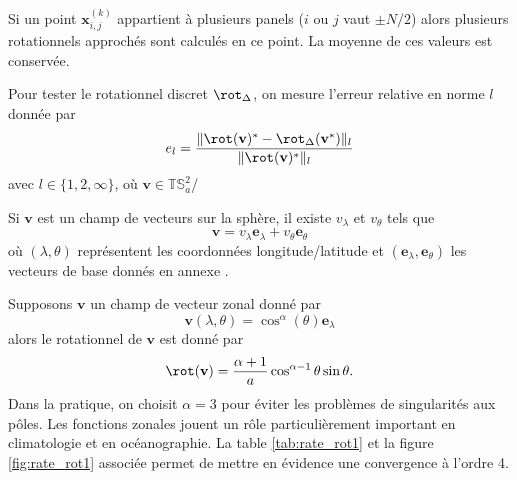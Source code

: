 Si un point $\mathbf{x}_{i,j}^{(k)}$ appartient à plusieurs panels ($i$ ou $j$ vaut $\pm N/2$) alors plusieurs rotationnels approchés sont calculés en ce point. La moyenne de ces valeurs est conservée.

Pour tester le rotationnel discret $\rot_{\Delta}$, on mesure l'erreur relative en norme $l$ donnée par
\begin{equation}
e_l = \dfrac{\| \rot(\mathbf{v})^* - \rot_{\Delta}(\mathbf{v}^*) \|_l}{\| \rot(\mathbf{v})^* \|_l}
\end{equation}
avec $l \in \lbrace 1, 2, \infty \rbrace$, où $\mathbf{v} \in \mathbb{T}\mathbb{S}_a^2$/

Si $\mathbf{v}$ est un champ de vecteurs sur la sphère, il existe $v_{\lambda}$ et $v_{\theta}$ tels que 
\begin{equation}
\mathbf{v} = v_{\lambda} \mathbf{e}_{\lambda} + v_{\theta} \mathbf{e}_{\theta}
\end{equation} 
où $(\lambda,\theta)$ représentent les coordonnées longitude/latitude et $(\mathbf{e}_{\lambda}, \mathbf{e}_{\theta})$ les vecteurs de base donnés en annexe \REF.

Supposons $\mathbf{v}$ un champ de vecteur zonal donné par
\begin{equation}
\mathbf{v}(\lambda, \theta) = \cos^{\alpha}(\theta) \mathbf{e}_{\lambda}
\end{equation}
alors le rotationnel de $\mathbf{v}$ est donné par
\begin{equation}
\rot(\mathbf{v}) = \dfrac{\alpha+1}{a} \cos^{\alpha-1} \theta \sin \theta .
\end{equation}
Dans la pratique, on choisit $\alpha = 3$ pour éviter les problèmes de singularités aux pôles. Les fonctions zonales jouent un rôle particulièrement important en climatologie et en océanographie. La table \ref{tab:rate_rot1} et la figure \ref{fig:rate_rot1} associée permet de mettre en évidence une convergence à l'ordre 4.



